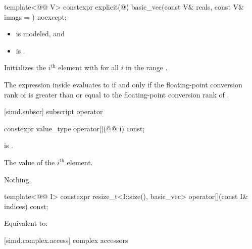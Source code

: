 \begin{itemdecl}
template<@@ V>
  constexpr explicit(@\seebelow@)
    basic_vec(const V& reals, const V& imags = {}) noexcept;
\end{itemdecl}

\begin{itemdescr}
\pnum
\constraints
\begin{itemize}
 \item
    is modeled, and
 \item
    is .
\end{itemize}

\pnum
\effects
Initializes the $i^\text{th}$ element with  for all $i$ in the range .

\pnum
\remarks
The expression inside  evaluates to  if and only
if the floating-point conversion rank of  is greater than
or equal to the floating-point conversion rank of .
\end{itemdescr}

[simd.subscr]{ subscript operator}

\begin{itemdecl}
constexpr value_type operator[](@@ i) const;
\end{itemdecl}

\begin{itemdescr}
\pnum
\expects
{} is .

\pnum
\returns
The value of the $i^\text{th}$ element.

\pnum
\throws
Nothing.
\end{itemdescr}

\begin{itemdecl}
template<@@ I>
  constexpr resize_t<I::size(), basic_vec> operator[](const I& indices) const;
\end{itemdecl}

\begin{itemdescr}
\pnum
\effects
Equivalent to: 
\end{itemdescr}

[simd.complex.access]{ complex accessors}

